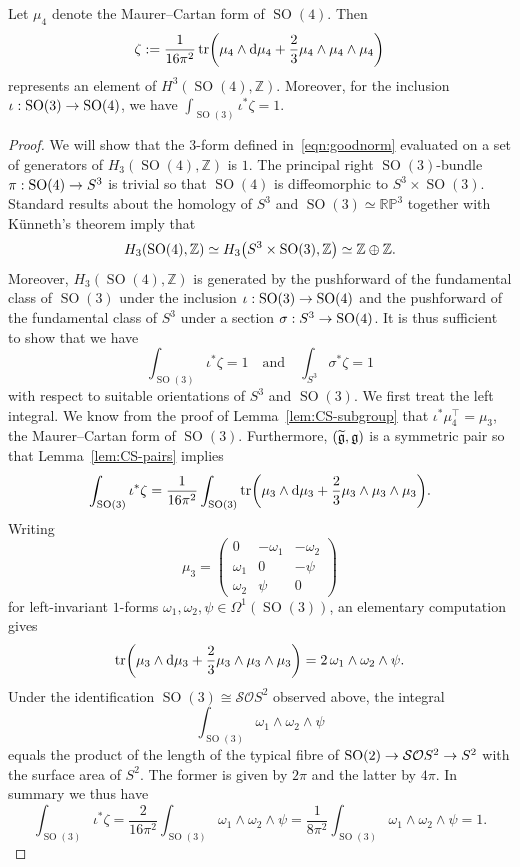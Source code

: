 \documentclass[AHL,Unicode,longabstracts]{cedram}
\DeclareMathOperator{\SO}{SO}
\DeclareMathOperator{\tr}{tr}
\renewcommand*{\d}{\mathrm{d}}
\newcommand*{\bbRP}{\mathbb{RP}}
\newcommand{\Z}{\mathbb{Z}}
\newcommand{\fkg}{\mathfrak{g}}
\newcommand{\clSO}{\mathcal{SO}}
\renewcommand*{\to}{\mathchoice{\longrightarrow}{\rightarrow}{\rightarrow}{\rightarrow}}
\let\originalleft\left
\let\originalright\right
\renewcommand{\left}{\mathopen{}\mathclose\bgroup\originalleft}
\renewcommand{\right}{\aftergroup\egroup\originalright}
\let\oldtilde\tilde
\renewcommand*{\tilde}[1]{\mathchoice{\widetilde{#1}}{\widetilde{#1}}{\oldtilde{#1}}{\oldtilde{#1}}}
\begin{document}
\begin{prop}\label{prop:normalization}
Let $\mu_4$ denote the Maurer--Cartan form of $\SO(4)$. Then
\begin{equation}\label{eqn:goodnorm}
\zeta:=\frac{1}{16\pi^2}\tr\left(\mu_4\wedge \d
\mu_4+\frac{2}{3}\mu_4\wedge\mu_4\wedge\mu_4\right)
\end{equation}
represents an element of $H^3(\SO(4),\Z)$. Moreover, for the inclusion $\iota:\SO(3)\to \SO(4)$, we have $\int_{\SO(3)}\iota^*\zeta=1$.
\end{prop}

\begin{proof}
We will show that the $3$-form defined in~\eqref{eqn:goodnorm} evaluated on a set of generators of $H_3(\SO(4),\Z)$ is $1$. The principal right $\SO(3)$-bundle $\pi : \SO(4) \to S^3$ is trivial so that $\SO(4)$ is diffeomorphic to $S^3\times \SO(3)$. Standard results about the homology of $S^3$ and $\SO(3)\simeq \bbRP^3$ together with K\"unneth's theorem imply that
\[
H_3(\SO(4),\Z)\simeq H_3\left(S^3\times \SO(3),\Z\right)\simeq \Z \oplus \Z.
\]
Moreover, $H_3(\SO(4),\Z)$ is generated by the pushforward of the fundamental class of $\SO(3)$ under the inclusion $\iota : \SO(3) \to
\SO(4)$ and the pushforward of the fundamental class of $S^3$ under a section $\sigma : S^3 \to \SO(4)$. It is thus sufficient to show that we have
\begin{equation}\label{eqn:integrals}
\int_{\SO(3)}\iota^*\zeta=1 \quad \text{and}\quad \int_{S^3}\sigma^*\zeta=1
\end{equation}
with respect to suitable orientations of $S^3$ and $\SO(3)$. We first treat the left integral. We know from the proof of Lemma~\ref{lem:CS-subgroup} that $\iota^*\mu_4^\top=\mu_3$, the Maurer--Cartan form of $\SO(3)$. Furthermore, $(\tilde{\fkg},\fkg)$ is a symmetric pair so that Lemma~\ref{lem:CS-pairs} implies
\[
\int_{\SO(3)}\iota^*\zeta=\frac{1}{16\pi^2}\int_{\SO(3)}\tr\left(\mu_3\wedge\d\mu_3+\frac{2}{3}\mu_3\wedge\mu_3\wedge\mu_3\right).
\]
Writing
\[
\mu_3=
\begin{pmatrix}
0 & -\omega_1 & -\omega_2 \\
\omega_1 & 0 & -\psi \\
\omega_2 & \psi & 0
\end{pmatrix}
\]
for left-invariant $1$-forms $\omega_1,\omega_2,\psi \in \Omega^1(\SO(3))$, an elementary computation gives
\[
\tr\left(\mu_3\wedge\d\mu_3+\frac{2}{3}\mu_3\wedge\mu_3\wedge\mu_3\right)=2\,\omega_1\wedge\omega_2\wedge\psi.
\]
Under the identification $\SO(3)\cong\clSO S^2$ observed above, the integral
\[
\int_{\SO(3)}\omega_1\wedge\omega_2\wedge\psi
\]
equals the product of the length of the typical fibre of $\SO(2)\to \clSO S^2 \to S^2$ with the surface area of $S^2$. The former is given by $2\pi$ and the latter by $4\pi$. In summary we thus have
\[
\int_{\SO(3)}\iota^*\zeta=\frac{2}{16\pi^2}\int_{\SO(3)}\omega_1\wedge\omega_2\wedge\psi=\frac{1}{8\pi^2}\int_{\SO(3)}\omega_1\wedge\omega_2\wedge\psi=1.
\]


\end{proof}
\end{document}
